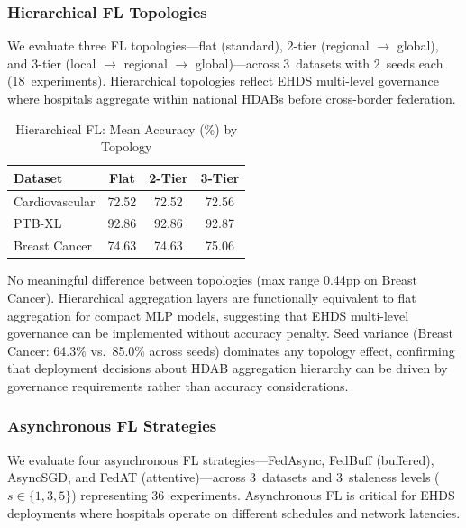 \documentclass[conference]{IEEEtran}
\begin{document}
\subsubsection{Hierarchical FL Topologies}
\label{sec:hierarchical_fl}

We evaluate three FL topologies---flat (standard), 2-tier (regional $\to$ global), and 3-tier (local $\to$ regional $\to$ global)---across 3~datasets with 2~seeds each (18~experiments). Hierarchical topologies reflect EHDS multi-level governance where hospitals aggregate within national HDABs before cross-border federation.

\begin{table}[htbp]
\centering
\caption{Hierarchical FL: Mean Accuracy (\%) by Topology}
\label{tab:hierarchical_fl}
\begin{tabular}{lccc}
\toprule
Dataset & Flat & 2-Tier & 3-Tier \\
\midrule
Cardiovascular & 72.52 & 72.52 & 72.56 \\
PTB-XL & 92.86 & 92.86 & 92.87 \\
Breast Cancer & 74.63 & 74.63 & 75.06 \\
\bottomrule
\end{tabular}

\vspace{1mm}
\footnotesize{No meaningful difference between topologies (max range 0.44pp on Breast Cancer). Hierarchical aggregation layers are functionally equivalent to flat aggregation for compact MLP models, suggesting that EHDS multi-level governance can be implemented without accuracy penalty. Seed variance (Breast Cancer: 64.3\% vs.\ 85.0\% across seeds) dominates any topology effect, confirming that deployment decisions about HDAB aggregation hierarchy can be driven by governance requirements rather than accuracy considerations.}
\end{table}

\subsubsection{Asynchronous FL Strategies}
\label{sec:async_fl}

We evaluate four asynchronous FL strategies---FedAsync, FedBuff (buffered), AsyncSGD, and FedAT (attentive)---across 3~datasets and 3~staleness levels ($s \in \{1, 3, 5\}$) representing 36~experiments. Asynchronous FL is critical for EHDS deployments where hospitals operate on different schedules and network latencies.
\end{document}
